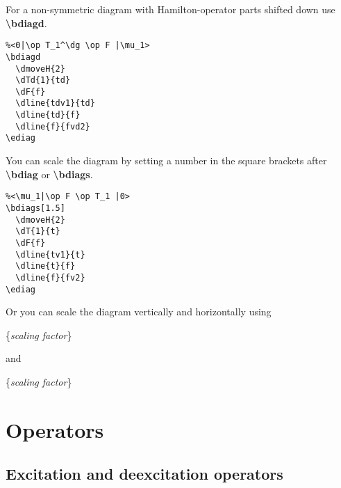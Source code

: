 \documentclass[a4paper]{article}
\newcommand{\myind}{\hspace{10pt}}
\begin{document}
For a non-symmetric diagram with Hamilton-operator parts shifted down use {\bf \textbackslash bdiagd}.

 \begin{minipage}[b]{0.5\linewidth}\centering
  \begin{lstlisting}
%<0|\op T_1^\dg \op F |\mu_1>
\bdiagd
  \dmoveH{2}
  \dTd{1}{td}
  \dF{f}
  \dline{tdv1}{td}
  \dline{td}{f}
  \dline{f}{fvd2}
\ediag
  \end{lstlisting}
 \end{minipage}
 \begin{minipage}[b]{0.5\linewidth}\centering
    \bdiagd
    \ediag
 \end{minipage}

You can scale the diagram by setting a number in the square brackets after {\bf \textbackslash bdiag}
or {\bf \textbackslash bdiags}.

 \begin{minipage}[b]{0.5\linewidth}\centering
  \begin{lstlisting}
%<\mu_1|\op F \op T_1 |0>
\bdiags[1.5]
  \dmoveH{2}
  \dT{1}{t}
  \dF{f}
  \dline{tv1}{t}
  \dline{t}{f}
  \dline{f}{fv2}
\ediag 
  \end{lstlisting}
 \end{minipage}
 \begin{minipage}[b]{0.5\linewidth}\centering
    \bdiags[1.5]
    \ediag
 \end{minipage}

Or you can scale the diagram vertically and horizontally using

\myind{\bf \textbackslash dvscale}\{{\it scaling factor}\}

and

\myind{\bf \textbackslash dhscale}\{{\it scaling factor}\}
 
\section{Operators}

\subsection{Excitation and deexcitation operators}
\end{document}
